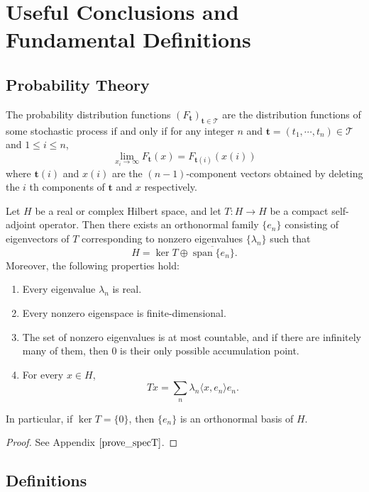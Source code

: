 \section{Useful Conclusions and Fundamental Definitions}

\subsection{Probability Theory}
\begin{theorem} The probability distribution functions
$(F_{\textbf{t}})_{\textbf{t}\in\mathcal{T}}$ are the distribution functions of some stochastic process if and
only if for any integer $n$ and $\textbf{t} = (t_1 , \cdots , t_n) \in \mathcal{T}$ and $1\leq i\leq n$,
\[\lim_{x_i \to\infty} F_{\textbf{t}}(x) = F_{\textbf{t}(i)}(x(i))\]
where $\textbf{t}(i)$ and $x(i)$ are the $(n- 1)$-component vectors obtained by deleting the
$i$ th components of $\textbf{t}$ and $x$ respectively. 
\end{theorem}

\begin{theorem}
Let $H$ be a real or complex Hilbert space, and let
\(
T:H\to H
\)
be a compact self-adjoint operator. Then there exists an orthonormal family
$\{e_n\}$ consisting of eigenvectors of $T$ corresponding to nonzero
eigenvalues $\{\lambda_n\}$ such that
\[
H=\ker T\oplus \overline{\operatorname{span}\{e_n\}}.
\]
Moreover, the following properties hold:
\begin{enumerate}
    \item Every eigenvalue $\lambda_n$ is real.
    \item Every nonzero eigenspace is finite-dimensional.
    \item The set of nonzero eigenvalues is at most countable, and if there
    are infinitely many of them, then $0$ is their only possible accumulation
    point.
    \item For every $x\in H$,
    \[
    Tx=\sum_n \lambda_n \langle x,e_n\rangle e_n.
    \]
\end{enumerate}
In particular, if $\ker T=\{0\}$, then $\{e_n\}$ is an orthonormal basis of
$H$.
\end{theorem}
\begin{proof}
    See Appendix $\eqref{prove_specT}$.
\end{proof}


\subsection{Definitions}

